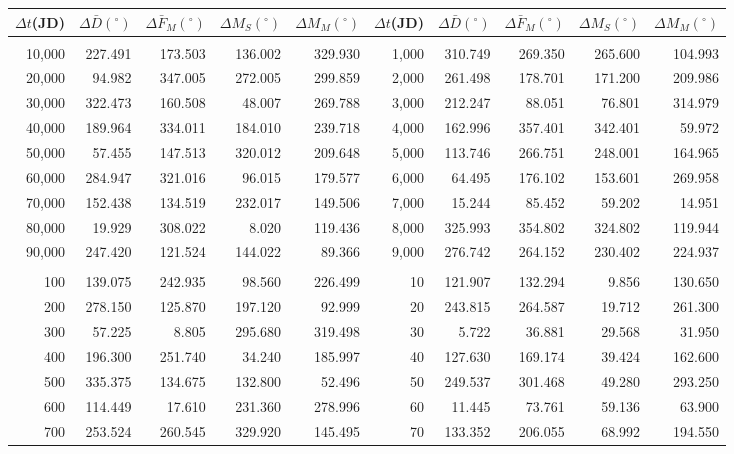 \clearpage
\begin{table}
\centering
\begin{tabular}{rrrrr|rrrrr}
$\Delta t$(JD)& $\Delta \bar{D}(^\circ)$ &  $\Delta \bar{F}_M(^\circ)$ & $\Delta M_S(^\circ)$& $\Delta M_M (^\circ)$ & $\Delta t$(JD) & $\Delta \bar{D}(^\circ)$ & $\Delta \bar{F}_M(^\circ)$ 
&$\Delta M_S(^\circ)$ & $\Delta M_M(^\circ)$\\ \hline
&&&&&&&&&\\[-1.75ex]
10,000 & 227.491 & 173.503 & 136.002 & 329.930 & 1,000 & 310.749 & 269.350 & 265.600 & 104.993\\
20,000 &  94.982 & 347.005 & 272.005 & 299.859 & 2,000 & 261.498 & 178.701 & 171.200 & 209.986\\
30,000 & 322.473 & 160.508 &  48.007 & 269.788 & 3,000 & 212.247 &  88.051 &  76.801 & 314.979\\
40,000 & 189.964 & 334.011 & 184.010 & 239.718 & 4,000 & 162.996 & 357.401 & 342.401 &  59.972\\
50,000 &  57.455 & 147.513 & 320.012 & 209.648 & 5,000 & 113.746 & 266.751 & 248.001 & 164.965\\
60,000 & 284.947 & 321.016 &  96.015 & 179.577 & 6,000 &  64.495 & 176.102 & 153.601 & 269.958\\
70,000 & 152.438 & 134.519 & 232.017 & 149.506 & 7,000 &  15.244 &  85.452 &  59.202 &  14.951\\
80,000 &  19.929 & 308.022 &   8.020 & 119.436 & 8,000 & 325.993 & 354.802 & 324.802 & 119.944\\
90,000 & 247.420 & 121.524 & 144.022 &  89.366 & 9,000 & 276.742 & 264.152 & 230.402 & 224.937\\
&&&&&&&&&\\
100 & 139.075 & 242.935 &  98.560 & 226.499 & 10 & 121.907 & 132.294 &   9.856 & 130.650\\
200 & 278.150 & 125.870 & 197.120 &  92.999 & 20 & 243.815 & 264.587 &  19.712 & 261.300\\
300 &  57.225 &   8.805 & 295.680 & 319.498 & 30 &   5.722 &  36.881 &  29.568 &  31.950\\
400 & 196.300 & 251.740 &  34.240 & 185.997 & 40 & 127.630 & 169.174 &  39.424 & 162.600\\
500 & 335.375 & 134.675 & 132.800 &  52.496 & 50 & 249.537 & 301.468 &  49.280 & 293.250\\
600 & 114.449 &  17.610 & 231.360 & 278.996 & 60 &  11.445 &  73.761 &  59.136 &  63.900\\
700 & 253.524 & 260.545 & 329.920 & 145.495 & 70 & 133.352 & 206.055 &  68.992 & 194.550\\

\end{tabular}
\end{table}
